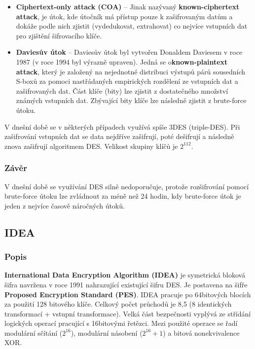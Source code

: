 \documentclass[12pt, a4paper]{article}
\begin{document}
\begin{itemize}
				\item \textbf{Ciphertext-only attack (COA)} -- Jinak nazývaný \textbf{known-ciphertext attack}, je útok, kde útočník má přístup pouze k zašifrovaným datům a dokáže podle nich zjistit (vydedukovat, extrahovat) co nejvíce vstupních dat pro zjištění šifrovacího klíče.
			\item \textbf{Daviesův útok} -- Daviesův útok byl vytvořen Donaldem Daviesem v roce 1987 (v roce 1994 byl výrazně upraven). Jedná se o\textbf{known-plaintext attack}, který je založený na nejednotné distribuci výstupů párů sousedních S-boxů za pomoci nastřádaných empirických rozdělení ze vstupních dat a zašifrovaných dat. Část klíče (bity) lze zjistit z dostatečného množství známých vstupních dat. Zbývající bity klíče lze následně zjistit z brute-force útoku. 
		\end{itemize}
	V dnešní době se v některých případech využívá spíše 3DES (triple-DES). Při zašifrování vstupních dat se data nejdříve zašifrují, poté dešifrují a následně znova zašifrují algoritmem DES. Velikost skupiny klíčů je $2^{112}$.
		\subsubsection{Závěr}
		V dnešní době se využívání DES silně nedoporučuje, protože rozšifrování pomocí brute-force útoku lze zvládnout za méně než 24 hodin, kdy brute-force útok je jeden z nejvíce časově náročných útoků.
	\subsection{IDEA}
	\label{subsec:idea}
		\subsubsection{Popis}
		\textbf{International Data Encryption Algorithm (IDEA)} je symetrická bloková šifra navržena v roce 1991 nahrazující existující šifru DES. Je postavena na šifře \textbf{Proposed Encryption Standard (PES)}. IDEA pracuje po 64bitových blocích za použití 128 bitového klíče. Celkový počet průchodů je 8,5 (8 identických transformací + vstupní transformace). Velká část bezpečnosti vyplývá ze střídání logických operací pracující s 16bitovými řetězci. Mezi použité operace se řadí modulární sčítání ($2^{16}$), modulární násobení ($2^{16} + 1$) a bitová nonekvivalence XOR. 
\end{document}
